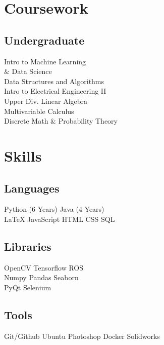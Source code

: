 \documentclass[]{deedy-resume-openfont}
\begin{document}
\begin{minipage}[t]{0.33\textwidth}
\sectionsep


\section{Coursework}
\subsection{Undergraduate}
Intro to Machine Learning \\
\hspace{4pt} \& Data Science \\
Data Structures and Algorithms \\
Intro to Electrical Engineering II \\
Upper Div. Linear Algebra \\
Multivariable Calculus \\
Discrete Math \& Probability Theory \\
\sectionsep


\section{Skills}
\subsection{Languages}
Python (6 Years) \textbullet{} Java (4 Years) \\
\LaTeX \hspace{1pt} \textbullet{} JavaScript \textbullet{} HTML \textbullet{} CSS \textbullet{} SQL
\sectionsep

\subsection{Libraries}
OpenCV \textbullet{} Tensorflow \textbullet{} ROS \\
Numpy \textbullet{} Pandas \textbullet{} Seaborn \\
PyQt \textbullet{} Selenium
\sectionsep

\subsection{Tools}
Git/Github \textbullet{} Ubuntu \textbullet{} Photoshop
Docker \textbullet{} Solidworks
\sectionsep


\end{minipage}
\end{document}
